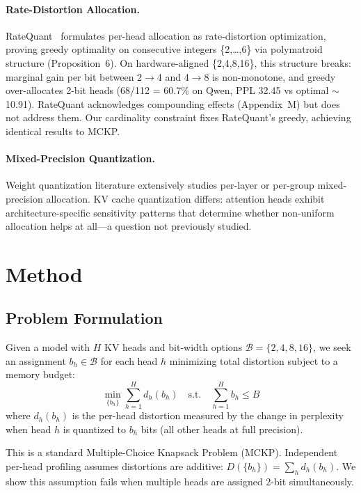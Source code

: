 \documentclass[11pt,a4paper]{article}
\begin{document}
\paragraph{Rate-Distortion Allocation.}
RateQuant~\cite{ratequant2024} formulates per-head allocation as rate-distortion optimization, proving greedy optimality on consecutive integers \{2,\ldots,6\} via polymatroid structure (Proposition~6).
On hardware-aligned \{2,4,8,16\}, this structure breaks: marginal gain per bit between 2$\to$4 and 4$\to$8 is non-monotone, and greedy over-allocates 2-bit heads (68/112 = 60.7\% on Qwen, PPL 32.45 vs optimal $\sim$10.91).
RateQuant acknowledges compounding effects (Appendix~M) but does not address them.
Our cardinality constraint fixes RateQuant's greedy, achieving identical results to MCKP.

\paragraph{Mixed-Precision Quantization.}
Weight quantization literature extensively studies per-layer or per-group mixed-precision allocation.
KV cache quantization differs: attention heads exhibit architecture-specific sensitivity patterns that determine whether non-uniform allocation helps at all---a question not previously studied.

\section{Method}
\label{sec:method}

\subsection{Problem Formulation}

Given a model with $H$ KV heads and bit-width options $\mathcal{B}=\{2,4,8,16\}$, we seek an assignment $b_h \in \mathcal{B}$ for each head $h$ minimizing total distortion subject to a memory budget:
\begin{equation}
\min_{\{b_h\}} \sum_{h=1}^{H} d_h(b_h) \quad \text{s.t.} \quad \sum_{h=1}^{H} b_h \le B
\end{equation}
where $d_h(b_h)$ is the per-head distortion measured by the change in perplexity when head $h$ is quantized to $b_h$ bits (all other heads at full precision).

This is a standard Multiple-Choice Knapsack Problem (MCKP).
Independent per-head profiling assumes distortions are additive: $D(\{b_h\}) = \sum_h d_h(b_h)$.
We show this assumption fails when multiple heads are assigned 2-bit simultaneously.
\end{document}
